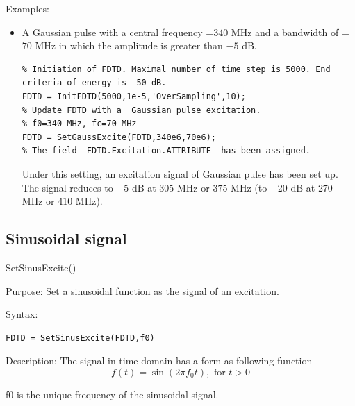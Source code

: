 \begin{FontDescr}{Examples:}
 \begin{itemize}
\item A Gaussian pulse with a central frequency =$340$ MHz and a  bandwidth of =$70$ MHz in which the amplitude is greater than $-5$ dB.
\begin{lstlisting}
% Initiation of FDTD. Maximal number of time step is 5000. End criteria of energy is -50 dB.
FDTD = InitFDTD(5000,1e-5,'OverSampling',10);
% Update FDTD with a  Gaussian pulse excitation.
% f0=340 MHz, fc=70 MHz
FDTD = SetGaussExcite(FDTD,340e6,70e6);
% The field  FDTD.Excitation.ATTRIBUTE  has been assigned.
\end{lstlisting}
Under this setting, an excitation signal of Gaussian pulse has been set up. The signal reduces to $-5$ dB at $305$ MHz or $375$ MHz (to $-20$ dB at $270$ MHz or $410$ MHz).
\end{itemize}
\end{FontDescr}

    \subsection{Sinusoidal signal}\label{subsec:Sinusoidal signal}
\begin{FontNameFunct}{SetSinusExcite()}
 \label{func:SetSinusExcite}
\end{FontNameFunct}

\begin{FontDescr}{Purpose:}
 Set a sinusoidal function as the signal of an excitation.
\end{FontDescr}

\begin{FontDescr}{Syntax:}
      \begin{lstlisting}
FDTD = SetSinusExcite(FDTD,f0)
      \end{lstlisting}
\end{FontDescr}

\begin{FontDescr}{Description:}
       The signal in time domain has a form as following function\\
\begin{equation}\label{equ:SinusoidalSignal_time}
 f(t)=\sin{(2\pi f_0t)}, \text{ for } t>0
\end{equation}
    \begin{FontPara}{f0}  \label{para:sinf0}
     is the unique frequency of the  sinusoidal signal.
    \end{FontPara}
\end{FontDescr}

